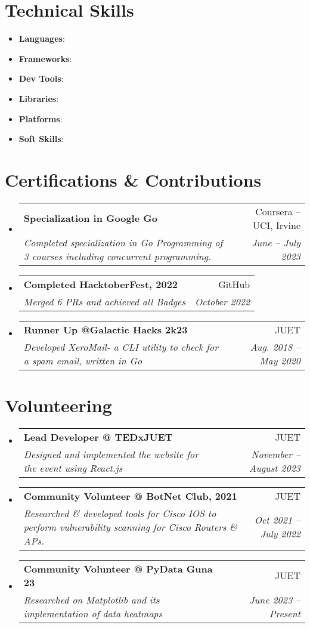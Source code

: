 \documentclass[letterpaper,10.9pt]{article}
\makeatletter
\newcommand{\resumeItem}[1]{
  \item\small{
    {#1 \vspace{-2pt}}
  }
}
\newcommand{\resumeSubheading}[4]{
  \vspace{-2pt}\item
    \begin{tabular*}{0.97\textwidth}[t]{l@{\extracolsep{\fill}}r}
      \textbf{#1} & #2 \\
      \textit{\small#3} & \textit{\small #4} \\
    \end{tabular*}\vspace{-7pt}
}
\newcommand{\resumeSubItem}[1]{\resumeItem{#1}\vspace{-4pt}}
\newcommand{\resumeSubHeadingListStart}{\begin{itemize}[leftmargin=0.15in, label={}]}
\newcommand{\resumeSubHeadingListEnd}{\end{itemize}}
\makeatother
\begin{document}
\section{Technical Skills}
     \resumeSubHeadingListStart
     \resumeSubItem{\textbf{Languages}:}{~~~~ Go, C/C++, Python, SQL (MYSQL, Postgres), JavaScript, BASH, HTML/CSS, Java} \\
     \resumeSubItem{\textbf{Frameworks}:}{~~~React, Node.js, CustomTkinter, Qt, Material-UI, FastAPI, RapidAPI} \\
     \resumeSubItem{\textbf{Dev Tools}:}{~~~~~~Git, Docker, TravisCI, Jeknins, AWS, Google Cloud Platform, VS Code, Jira, Visual Studio, Firebase} \\
     \resumeSubItem{\textbf{Libraries}:}{~~~~~~~~net, net/http, requests, Cobra, Viper, Docker SDK, NumPy, Matplotlib}
     \resumeSubItem{\textbf{Platforms}:}{~~~~~~~LINUX, Web, Windows, Arduino, AWS, GCP, IBM Cloud}
     \resumeSubItem{\textbf{Soft Skills}:}{~~~~~~Leadership, Event Management, Writing, Public Speaking, Time Management}
\resumeSubHeadingListEnd

\section{Certifications \& Contributions}
  \resumeSubHeadingListStart
    \resumeSubheading
      {Specialization in Google Go}{Coursera -- UCI, Irvine}
      {Completed specialization in Go Programming of 3 courses including concurrent programming.}{June -- July 2023}
    \resumeSubheading
      {Completed HacktoberFest, 2022}{GitHub}
      {Merged 6 PRs and achieved all Badges}{October 2022}
    \resumeSubheading
      {Runner Up @Galactic Hacks 2k23}{JUET}
      {Developed XeroMail- a CLI utility to check for a spam email, written in Go}{Aug. 2018 -- May 2020}
  \resumeSubHeadingListEnd

\section{Volunteering}
  \resumeSubHeadingListStart
    \resumeSubheading
      {Lead Developer @ TEDxJUET}{JUET}
      {Designed and implemented the website for the event using React.js}{November -- August 2023}
    \resumeSubheading
      {Community Volunteer @ BotNet Club, 2021}{JUET}
      {Researched \& developed tools for Cisco IOS to perform vulnerability scanning for Cisco Routers \& APs.}{Oct 2021 -- July 2022 }
    \resumeSubheading
      {Community Volunteer @ PyData Guna 23}{JUET}
      {Researched on Matplotlib and its implementation of data heatmaps}{June 2023 -- Present}
  \resumeSubHeadingListEnd

\end{document}
